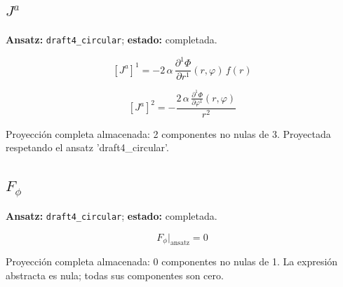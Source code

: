 \documentclass[11pt]{article}
\begin{document}
\subsection*{$ J^a $}
\textbf{Ansatz:} \texttt{draft4\_circular}; \textbf{estado:} completada.\par
\begin{dmath*}[breakdepth={5}]
\left[J^a\right]^{1} = -2\,\alpha\,\frac{\partial^{1} \Phi}{\partial r^{1}}\!\left(r, \varphi\right)\,f\!\left(r\right)
\end{dmath*}
\par\smallskip
\begin{dmath*}[breakdepth={5}]
\left[J^a\right]^{2} = -\frac{2\,\alpha\,\frac{\partial^{1} \Phi}{\partial \varphi^{1}}\!\left(r, \varphi\right)}{{r}^{2}}
\end{dmath*}
\par\smallskip
Proyección completa almacenada: 2 componentes no nulas de 3. Proyectada respetando el ansatz 'draft4\_circular'.\par\medskip
{}
\subsection*{$ F_{\phi} $}
\textbf{Ansatz:} \texttt{draft4\_circular}; \textbf{estado:} completada.\par
\begin{dmath*}[breakdepth={5}]
F_{\phi}\big|_{\mathrm{ansatz}} = 0
\end{dmath*}
\par\smallskip
Proyección completa almacenada: 0 componentes no nulas de 1. La expresión abstracta es nula; todas sus componentes son cero.\par\medskip
{}
\end{document}

